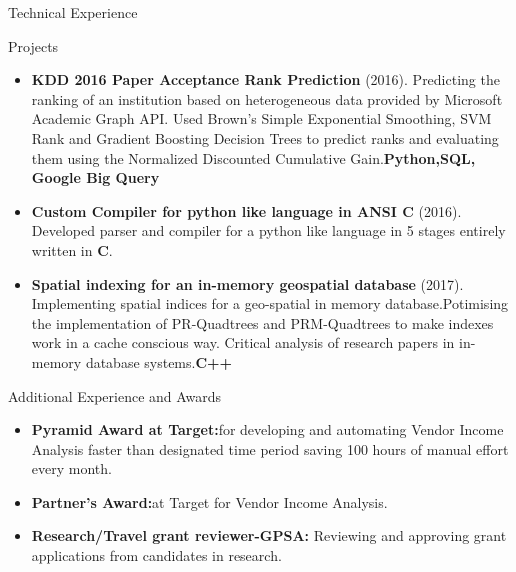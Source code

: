 \documentclass[]{nakulcv}
\begin{document}
\begin{cvsection}{Technical Experience}
	\begin{cvsubsection}{Projects}{}{}
		\begin{itemize}
			\item \textbf{KDD 2016 Paper Acceptance Rank Prediction} (2016). Predicting the ranking of an institution based on heterogeneous data provided by Microsoft Academic Graph API. Used Brown's Simple Exponential Smoothing, SVM Rank and Gradient Boosting Decision Trees to predict ranks and evaluating them using the Normalized Discounted Cumulative Gain.\textbf{Python,SQL, Google Big Query} 
			\item \textbf{Custom Compiler for python like language in ANSI C} (2016). Developed parser and compiler for a python like language in 5 stages entirely written in \textbf{C}.
			\item \textbf{Spatial indexing for an in-memory geospatial database} (2017). Implementing spatial indices for a geo-spatial in memory database.Potimising the implementation of PR-Quadtrees and PRM-Quadtrees to make indexes work in a cache conscious way. Critical analysis of research papers in in-memory database systems.\textbf{C++}
		\end{itemize}
	\end{cvsubsection}
\end{cvsection}

\begin{cvsection}{Additional Experience and Awards}
	\begin{cvsubsection}{}{}{}	
		\begin{itemize}
			\item \textbf{Pyramid Award at Target:}for developing and automating Vendor Income Analysis faster than designated time period saving 100 hours of manual effort every month.
			\item \textbf{Partner's Award:}at Target for Vendor Income Analysis. 
			\item \textbf{Research/Travel grant reviewer-GPSA:} Reviewing and approving grant applications from candidates in research. 
		\end{itemize}
	\end{cvsubsection}
\end{cvsection}
\end{document}
